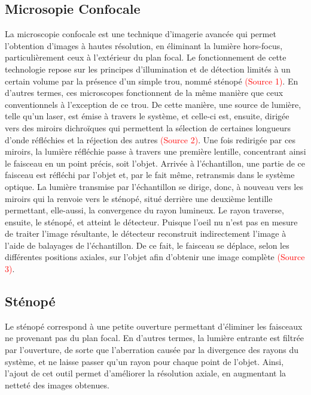 \documentclass[11pt,letterpaper]{article}
\begin{document}
\subsection{Microsopie Confocale}
La microscopie confocale est une technique d'imagerie avancée qui permet l'obtention d'images à hautes résolution, en éliminant la lumière hors-focus, particulièrement ceux à l'extérieur du plan focal. Le fonctionnement de cette technologie repose sur les principes d'illumination et de détection limités à un certain volume par la présence d'un simple trou, nommé sténopé \textcolor{red}{(Source 1)}. En d'autres termes, ces microscopes fonctionnent de la même manière que ceux conventionnels à l'exception de ce trou. De cette manière, une source de lumière, telle qu'un laser, est émise à travers le système, et celle-ci est, ensuite, dirigée vers des miroirs dichroïques qui permettent la sélection de certaines longueurs d'onde réfléchies et la réjection des autres \textcolor{red}{(Source 2)}. Une fois redirigée par ces miroirs, la lumière réfléchie passe à travers une première lentille, concentrant ainsi le faisceau en un point précis, soit l'objet. Arrivée à l'échantillon, une partie de ce faisceau est réfléchi par l'objet et, par le fait même, retransmis dans le système optique. La lumière transmise par l'échantillon se dirige, donc, à nouveau vers les miroirs qui la renvoie vers le sténopé, situé derrière une deuxième lentille permettant, elle-aussi, la convergence du rayon lumineux. Le rayon traverse, ensuite, le sténopé, et atteint le détecteur. Puisque l'oeil nu n'est pas en mesure de traiter l'image résultante, le détecteur reconstruit indirectement l'image à l'aide de balayages de l'échantillon. De ce fait, le faisceau se déplace, selon les différentes positions axiales, sur l'objet afin d'obtenir une image complète \textcolor{red}{(Source 3)}.


\subsection{Sténopé}
Le sténopé correspond à une petite ouverture permettant d'éliminer les faisceaux ne provenant pas du plan focal. En d'autres termes, la lumière entrante est filtrée par l'ouverture, de sorte que l'aberration causée par la divergence des rayons du système, et ne laisse passer qu'un rayon pour chaque point de l'objet. Ainsi, l'ajout de cet outil permet d'améliorer la résolution axiale, en augmentant la netteté des images obtenues.
\end{document}
